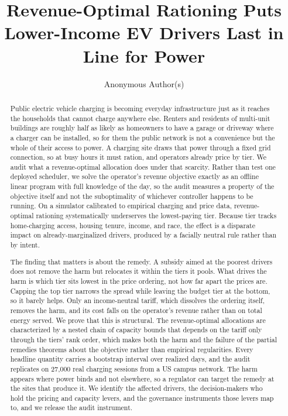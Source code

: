 \documentclass[manuscript, screen, review, anonymous]{acmart}
\begin{document}
\title{Revenue-Optimal Rationing Puts Lower-Income EV Drivers Last in Line for Power}


\author{Anonymous Author(s)}
\renewcommand{\shortauthors}{Anonymous}

\begin{abstract}
Public electric vehicle charging is becoming everyday infrastructure just as it reaches the households that cannot charge anywhere else. Renters and residents of multi-unit buildings are roughly half as likely as homeowners to have a garage or driveway where a charger can be installed, so for them the public network is not a convenience but the whole of their access to power. A charging site draws that power through a fixed grid connection, so at busy hours it must ration, and operators already price by tier. We audit what a revenue-optimal allocation does under that scarcity. Rather than test one deployed scheduler, we solve the operator's revenue objective exactly as an offline linear program with full knowledge of the day, so the audit measures a property of the objective itself and not the suboptimality of whichever controller happens to be running. On a simulator calibrated to empirical charging and price data, revenue-optimal rationing systematically underserves the lowest-paying tier. Because tier tracks home-charging access, housing tenure, income, and race, the effect is a disparate impact on already-marginalized drivers, produced by a facially neutral rule rather than by intent.

The finding that matters is about the remedy. A subsidy aimed at the poorest drivers does not remove the harm but relocates it within the tiers it pools. What drives the harm is which tier sits lowest in the price ordering, not how far apart the prices are. Capping the top tier narrows the spread while leaving the budget tier at the bottom, so it barely helps. Only an income-neutral tariff, which dissolves the ordering itself, removes the harm, and its cost falls on the operator's revenue rather than on total energy served. We prove that this is structural. The revenue-optimal allocations are characterized by a nested chain of capacity bounds that depends on the tariff only through the tiers' rank order, which makes both the harm and the failure of the partial remedies theorems about the objective rather than empirical regularities. Every headline quantity carries a bootstrap interval over realized days, and the audit replicates on 27,000 real charging sessions from a US campus network. The harm appears where power binds and not elsewhere, so a regulator can target the remedy at the sites that produce it. We identify the affected drivers, the decision-makers who hold the pricing and capacity levers, and the governance instruments those levers map to, and we release the audit instrument.
\end{abstract}
\end{document}
